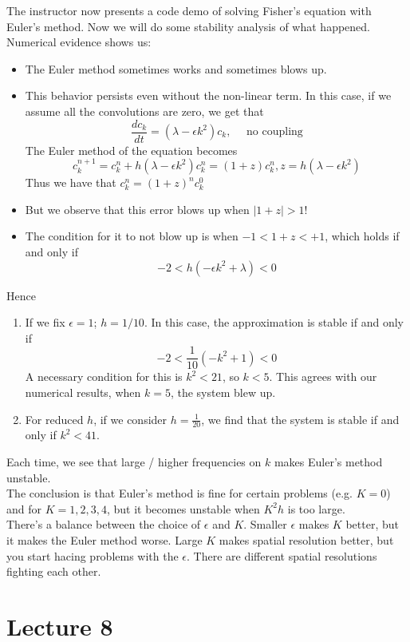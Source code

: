 \documentclass{article}
\begin{document}
The instructor now presents a code demo of solving Fisher's equation with Euler's method. Now we will do some stability analysis of what happened. Numerical evidence shows us:
\begin{itemize}
    \item The Euler method sometimes works and sometimes blows up.
    \item This behavior persists even without the non-linear term. In this case, if we assume all the convolutions are zero, we get that
    \[\frac{dc_k}{dt} = (\lambda - \epsilon k^2) c_k,\quad \text{ no coupling}\]
    The Euler method of the equation becomes
    \[c_k^{n+1} = c_k^n + h(\lambda - \epsilon k^2) c_k^n = (1 + z) c_k^n, z = h(\lambda - \epsilon k^2)\]
    Thus we have that $c_k^n = (1 + z)^n c_k^0$
    \item But we observe that this error blows up when $|1 + z| > 1$!
    \item The condition for it to not blow up is when $-1 < 1 + z < +1$, which holds if and only if
    \[-2 < h(-\epsilon k^2 + \lambda) < 0\]
\end{itemize}

Hence 
\begin{enumerate}
    \item If we fix $\epsilon = 1$; $h = 1/10$. In this case, the approximation is stable if and only if
    \[-2 < \frac{1}{10} (-k^2 + 1) < 0\]
    A necessary condition for this is $k^2 < 21$, so $k < 5$. This agrees with our numerical results, when $k = 5$, the system blew up.
    \item For reduced $h$, if we consider $h = \frac{1}{20}$, we find that the system is stable if and only if $k^2 < 41$.
\end{enumerate}
Each time, we see that large / higher frequencies on $k$ makes Euler's method unstable.\\

The conclusion is that Euler's method is fine for certain problems (e.g. $K = 0$) and for $K = 1, 2, 3, 4$, but it becomes unstable when $K^2 h$ is too large.\\

There's a balance between the choice of $\epsilon$ and $K$. Smaller $\epsilon$ makes $K$ better, but it makes the Euler method worse. Large $K$ makes spatial resolution better, but you start hacing problems with the $\epsilon$.  There are different spatial resolutions fighting each other.

\newpage
\section{Lecture 8}
\end{document}

